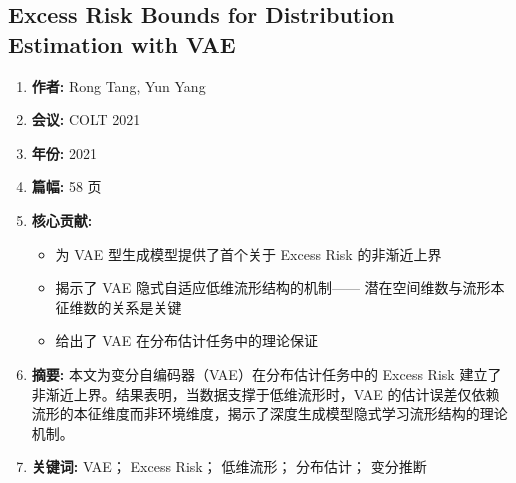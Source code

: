 \subsection{Excess Risk Bounds for Distribution Estimation with VAE}
\begin{enumerate}
    \item \textbf{作者:} Rong Tang, Yun Yang
    \item \textbf{会议:} COLT 2021
    \item \textbf{年份:} 2021
    \item \textbf{篇幅:} 58 页
    \item \textbf{核心贡献:}
        \begin{itemize}
            \item 为 VAE 型生成模型提供了首个关于 Excess Risk 的非渐近上界
            \item 揭示了 VAE 隐式自适应低维流形结构的机制——
                  潜在空间维数与流形本征维数的关系是关键
            \item 给出了 VAE 在分布估计任务中的理论保证
        \end{itemize}
    \item \textbf{摘要:} 本文为变分自编码器（VAE）在分布估计任务中的 Excess Risk 建立了非渐近上界。结果表明，当数据支撑于低维流形时，VAE 的估计误差仅依赖流形的本征维度而非环境维度，揭示了深度生成模型隐式学习流形结构的理论机制。
    \item \textbf{关键词:} VAE； Excess Risk； 低维流形； 分布估计； 变分推断
\end{enumerate}

